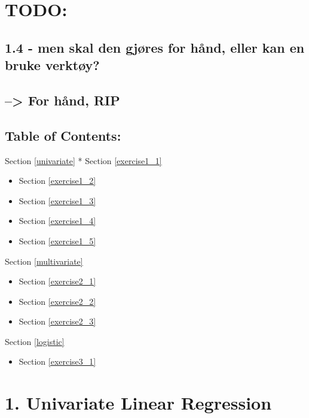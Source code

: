 \documentclass[11pt]{article}
\providecommand{\tightlist}{%
      \setlength{\itemsep}{0pt}\setlength{\parskip}{0pt}}
\begin{document}
    \hypertarget{todo}{%
\section{TODO:}\label{todo}}

\hypertarget{men-skal-den-gjuxf8res-for-huxe5nd-eller-kan-en-bruke-verktuxf8y}{%
\subsection{1.4 - men skal den gjøres for hånd, eller kan en bruke
verktøy?}\label{men-skal-den-gjuxf8res-for-huxe5nd-eller-kan-en-bruke-verktuxf8y}}

\hypertarget{for-huxe5nd-rip}{%
\subsection{--\textgreater{} For hånd, RIP}\label{for-huxe5nd-rip}}

    \hypertarget{table-of-contents}{%
\subsection{Table of Contents:}\label{table-of-contents}}

Section \ref{univariate} * Section \ref{exercise1_1}

\begin{itemize}
\item
  Section \ref{exercise1_2}
\item
  Section \ref{exercise1_3}
\item
  Section \ref{exercise1_4}
\item
  Section \ref{exercise1_5}
\end{itemize}

Section \ref{multivariate}

\begin{itemize}
\item
  Section \ref{exercise2_1}
\item
  Section \ref{exercise2_2}
\item
  Section \ref{exercise2_3}
\end{itemize}

Section \ref{logistic}

\begin{itemize}
\tightlist
\item
  Section \ref{exercise3_1}
\end{itemize}

    \hypertarget{univariate-linear-regression}{%
\section{1. Univariate Linear Regression
}\label{univariate-linear-regression}}
\end{document}
